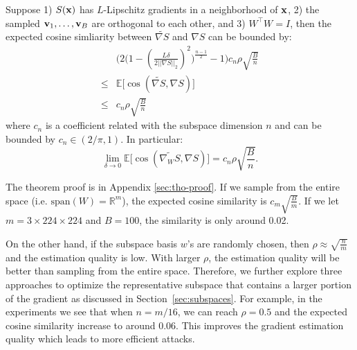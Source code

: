 \begin{theorem}
\label{tho:dimred}
Suppose 1) $S({\bf x})$ has $L$-Lipschitz gradients in a neighborhood of $\bf x$, 2) the sampled ${\bf v}_1, \ldots, {\bf v}_B$ are orthogonal to each other, and 3) $W^\intercal W = I$, then the expected cosine simliarity between $\widetilde{\nabla S}$ and $\nabla S$ can be bounded by:
\begin{align}
    &\bigg( 2\bigg(1-(\frac{L\delta}{2||\nabla S||_2})^2\bigg)^{\frac{n-1}{2}} - 1 \bigg)c_n\rho\sqrt{\frac B n} \\
    \leq & \mathbb{E}\big[\cos (\widetilde{\nabla S}, \nabla S) \big]\\
    \leq & c_n\rho\sqrt{\frac B n}
\end{align}
where $c_n$ is a coefficient related with the subspace dimension $n$ and can be bounded by $c_n \in (2/\pi, 1)$. In particular:
\begin{equation}
    \label{eqn:grad-est-qual-dr}
    \lim_{\delta\rightarrow 0}\mathbb{E}\big[\cos (\widetilde{\nabla_W S}, \nabla S) \big] = c_n\rho 
    \sqrt{\frac B n}.
\end{equation}
\end{theorem}
The theorem proof is in Appendix \ref{sec:tho-proof}. 
If we sample from the entire space (i.e. $\text{span}(W) = \mathbb{R}^m$), the expected cosine similarity is $c_m\sqrt{\frac{B}{m}}$.
If we let $m=3\times224\times224$ and $B=100$, the similarity is only around 0.02.

On the other hand, if the subspace basis $w$'s are randomly chosen, then $\rho \approx \sqrt{\frac{n}{m}}$ and the estimation quality is low. With larger $\rho$, the estimation quality will be better than sampling from the entire space.
Therefore, we further explore three approaches to optimize the representative subspace that contains a larger portion of the gradient as discussed in Section~\ref{sec:subspaces}.
For example, in the experiments we see that when $n=m/16$, we can reach $\rho=0.5$ and the expected cosine similarity increase to around 0.06.
This improves the gradient estimation quality which leads to more efficient attacks.


